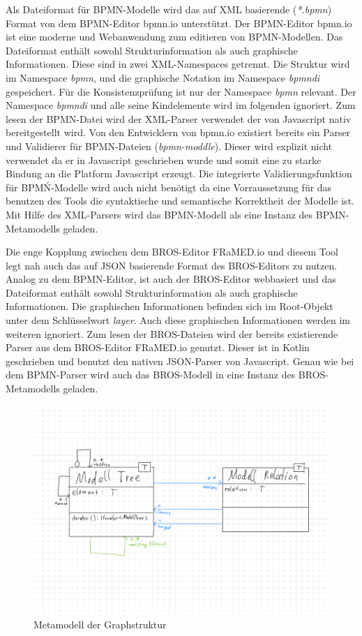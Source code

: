 Als Dateiformat für BPMN-Modelle wird das auf XML basierende (\emph{*.bpmn}) Format von dem BPMN-Editor bpmn.io unterstützt.
Der BPMN-Editor bpmn.io ist eine moderne und Webanwendung zum editieren von BPMN-Modellen.
Das Dateiformat enthält sowohl Strukturinformation als auch graphische Informationen.
Diese sind in zwei XML-Namespaces getrennt.
Die Struktur wird im Namespace \emph{bpmn}, und die graphische Notation im Namespace \emph{bpmndi} gespeichert.
Für die Konsistenzprüfung ist nur der Namespace \emph{bpmn} relevant.
Der Namespace \emph{bpmndi} und alle seine Kindelemente wird im folgenden ignoriert.
Zum lesen der BPMN-Datei wird der XML-Parser verwendet der von Javascript nativ bereitgestellt wird.
Von den Entwicklern von bpmn.io existiert bereits ein Parser und Validierer für BPMN-Dateien (\emph{bpmn-moddle}).
Dieser wird explizit nicht verwendet da er in Javascript geschrieben wurde und somit eine zu starke Bindung an die Platform Javascript erzeugt.
Die integrierte Validierungsfunktion für BPMŃ-Modelle wird auch nicht benötigt da eine Vorraussetzung für das benutzen des Tools die syntaktische und semantische Korrektheit der Modelle ist. 
Mit Hilfe des XML-Parsers wird das BPMN-Modell als eine Instanz des BPMN-Metamodells geladen.

Die enge Kopplung zwischen dem BROS-Editor FRaMED.io und diesem Tool legt nah auch das auf JSON basierende Format des BROS-Editors zu nutzen.
Analog zu dem BPMN-Editor, ist auch der BROS-Editor webbasiert und das Dateiformat enthält sowohl Strukturinformation als auch graphische Informationen.
Die graphischen Informationen befinden sich im Root-Objekt unter dem Schlüsselwort \emph{layer}.
Auch diese graphischen Informationen werden im weiteren ignoriert.
Zum lesen der BROS-Dateien wird der bereits existierende Parser aus dem BROS-Editor FRaMED.io genutzt.
Dieser ist in Kotlin geschrieben und benutzt den nativen JSON-Parser von Javascript.
Genau wie bei dem BPMN-Parser wird auch das BROS-Modell in eine Instanz des BROS-Metamodells geladen.

\begin{figure}
    \centering
    \includegraphics[width=\textwidth,keepaspectratio]{../images/UmlGraph.pdf}%
    \caption{Metamodell der Graphstruktur}%
    \label{fig:UmlGraph}
\end{figure}

